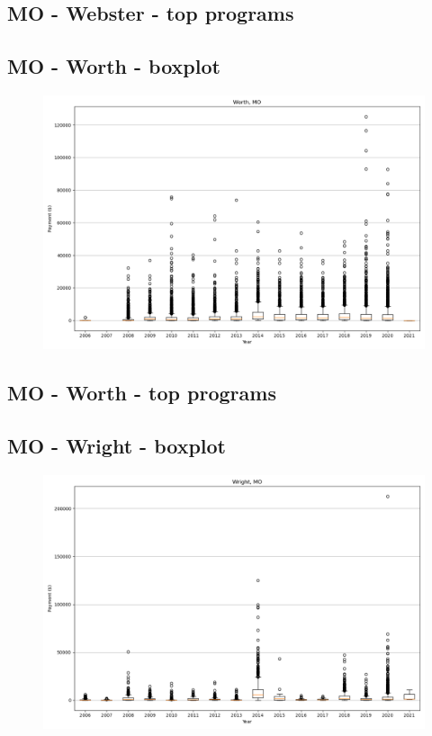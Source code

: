 \subsection*{MO - Webster - top programs}

\newpage
\subsection*{MO - Worth - boxplot}
\begin{figure}[h]
\centering
\includegraphics[width=7in]{../output/boxplots/counties/Worth-MO_boxplot.png}
\end{figure}


\subsection*{MO - Worth - top programs}

\newpage
\subsection*{MO - Wright - boxplot}
\begin{figure}[h]
\centering
\includegraphics[width=7in]{../output/boxplots/counties/Wright-MO_boxplot.png}
\end{figure}


